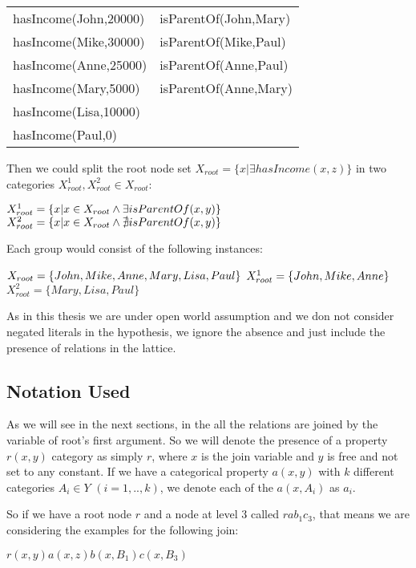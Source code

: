 \begin{tabular}{*{2}{l}}
  hasIncome(John,20000) & isParentOf(John,Mary) \\
  hasIncome(Mike,30000) & isParentOf(Mike,Paul) \\
  hasIncome(Anne,25000) & isParentOf(Anne,Paul) \\
  hasIncome(Mary,5000) 	& isParentOf(Anne,Mary) \\
  hasIncome(Lisa,10000) & 			\\
  hasIncome(Paul,0)	& 			\\
\end{tabular}

Then we could split the root node set $X_{root}=\{x|\exists hasIncome(x,z)\}$ in two categories $X_{root}^1,X_{root}^2
\in
X_{root}$:

$X_{root}^1=\{x| x \in X_{root} \land \exists isParentOf(x,y)\} \\$
$X_{root}^2=\{x| x \in X_{root} \land \nexists isParentOf(x,y)\} \\$

Each group would consist of the following instances:

$X_{root}=\{John,Mike,Anne,Mary,Lisa,Paul\} \\$
$X_{root}^1=\{John,Mike,Anne\} \\$
$X_{root}^2=\{Mary,Lisa,Paul\}$

As in this thesis we are under open world assumption and we don not consider negated literals in the hypothesis, we
ignore
the absence and just include the presence of relations in the lattice.


\subsection{Notation Used}

As we will see in the next sections, in the \graphname all the relations are joined by the variable of root's first
argument. So we will denote the presence of a property $r(x,y)$ category as simply $r$, where $x$ is the join variable
and $y$ is free and not set to any constant. If we have a categorical property $a(x,y)$ with $k$ different categories
$A_i \in Y$ $(i=1,..,k)$, we denote each of the $a(x,A_i)$ as $a_i$.

So if we have a root node $r$ and a node at level 3 called $rab_1c_3$, that means we are considering the examples for
the following join:

$r(x,y)a(x,z)b(x,B_1)c(x,B_3)$


